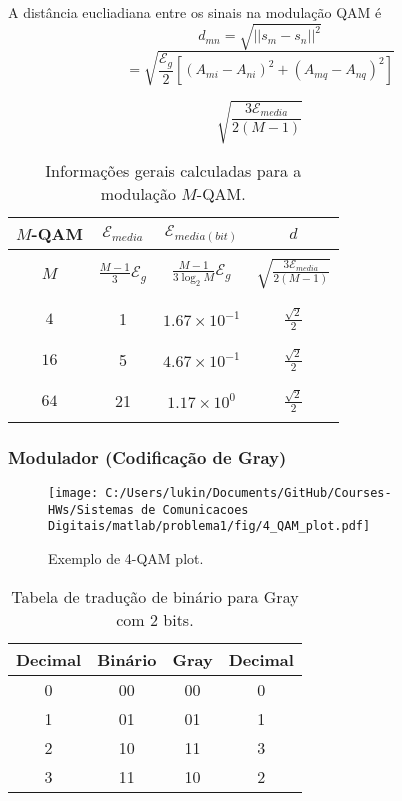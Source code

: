 A distância eucliadiana entre os sinais na modulação QAM é
$$ d_{mn} = \sqrt{|| s_m - s_n||^2}$$ 
$$ = \sqrt{\frac{\mathcal{E}_g}{2}[(A_{mi} - A_{ni})^2 + (A_{mq} - A_{nq})^2]}$$

$$\sqrt{\frac{3 \mathcal{E}_{media}}{2(M-1)}} $$

\begin{table}[!ht]
    \centering
    \begin{tabular}{|c|c|c|c|}
    \hline
    $M$-QAM & $\mathcal{E}_{media}$ & $\mathcal{E}_{media(bit)}$ & $d$ \\ \hline
    & &  &  \\ 
    $M$ & $\frac{M-1}{3} \mathcal{E}_g$ & $ \frac{M-1}{3\log_2 M} \mathcal{E}_g$ & $\sqrt{\frac{3 \mathcal{E}_{media}}{2(M-1)}} $ \\ 
    & &  &  \\ \hline
    & &  &  \\ 
    $4$     & 1 & $1.67\times 10^{-1}$ & $\frac{\sqrt{2}}{2}$ \\ 
    & &  &  \\ \hline
    & &  &  \\ 
    $16$    & 5 & $4.67\times 10^{-1}$ & $\frac{\sqrt{2}}{2}$ \\ 
    & &  &  \\ \hline
    & &  &  \\ 
    $64$    & 21 & $1.17\times 10^{0}$ & $\frac{\sqrt{2}}{2}$ \\
    & &  &  \\ \hline
    \end{tabular}
    \caption{Informações gerais calculadas para a modulação $M$-QAM.}
    \label{tab:Resume_QAM}
\end{table}

\clearpage

\subsubsection{Modulador (Codificação de Gray)}

\begin{figure}[!ht]
    \centering
    \texttt{[image: C:/Users/lukin/Documents/GitHub/Courses-HWs/Sistemas de Comunicacoes Digitais/matlab/problema1/fig/4\_QAM\_plot.pdf]}
    \caption{Exemplo de 4-QAM plot.}
    \label{fig:4_QAM_plot}
\end{figure}

\begin{table}[!ht]
    \centering
    \begin{tabular}{|c|c|c|c|}
    \hline
    Decimal & Binário & Gray & Decimal \\ \hline
    0 & 00 & 00 & 0\\ \hline
    1 & 01 & 01 & 1\\ \hline
    2 & 10 & 11 & 3\\ \hline
    3 & 11 & 10 & 2\\ \hline
    \end{tabular}
    \caption{Tabela de tradução de binário para Gray com 2 bits.}
    \label{tab:Alfabeto_Gray}
\end{table}

